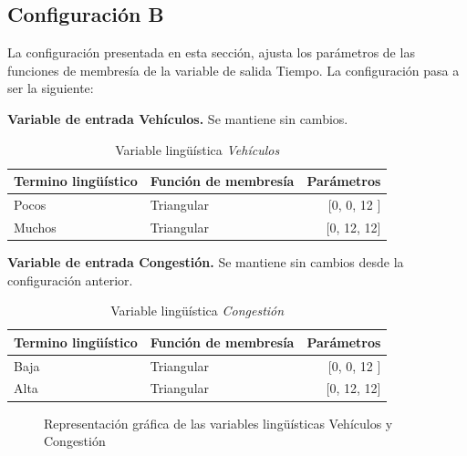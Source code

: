  


\pagebreak
\subsection{Configuración B}
La configuración presentada en esta sección, ajusta los parámetros de las funciones de membresía de la variable de salida Tiempo. La configuración pasa a ser la siguiente: 

\textbf{Variable de entrada Vehículos.} Se mantiene sin cambios.

\begin{table}[!h]
	\centering
	\begin{tabular}{llr} \toprule
		Termino lingüístico & Función de membresía & Parámetros \\ \midrule
		Pocos & Triangular & [0, 0, 12 ] \\
		Muchos & Triangular & [0, 12, 12] \\ \bottomrule
	\end{tabular}
	\caption{Variable lingüística \textit{Vehículos}}
\end{table}


\textbf{Variable de entrada Congestión.} Se mantiene sin cambios desde la configuración anterior.


\begin{table}[!h]
	\centering
	\begin{tabular}{llr} \toprule
		Termino lingüístico & Función de membresía & Parámetros \\ \midrule
		Baja & Triangular & [0, 0, 12 ] \\
		Alta & Triangular & [0, 12, 12] \\ \bottomrule
	\end{tabular}
	\caption{Variable lingüística \textit{Congestión}}
\end{table}

\begin{figure}[H]
	\centering
	\caption[Gráficas de las variables lingüísticas vehículos y congestión]{Representación gráfica de las variables lingüísticas Vehículos y Congestión }
\end{figure}

